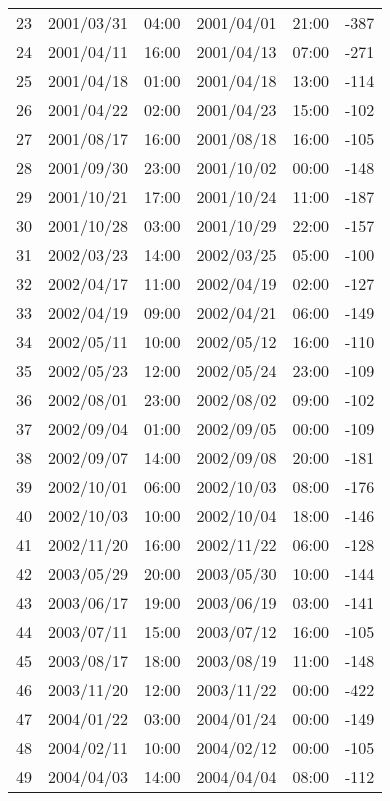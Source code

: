 \begin{table}[h]
\begin{tabular}{cccccc}
    23 & 2001/03/31 & 04:00 & 2001/04/01 & 21:00 & -387 \\
    24 & 2001/04/11 & 16:00 & 2001/04/13 & 07:00 & -271 \\
    25 & 2001/04/18 & 01:00 & 2001/04/18 & 13:00 & -114 \\
    26 & 2001/04/22 & 02:00 & 2001/04/23 & 15:00 & -102 \\
    27 & 2001/08/17 & 16:00 & 2001/08/18 & 16:00 & -105 \\
    28 & 2001/09/30 & 23:00 & 2001/10/02 & 00:00 & -148 \\
    29 & 2001/10/21 & 17:00 & 2001/10/24 & 11:00 & -187 \\
    30 & 2001/10/28 & 03:00 & 2001/10/29 & 22:00 & -157 \\
    31 & 2002/03/23 & 14:00 & 2002/03/25 & 05:00 & -100 \\
    32 & 2002/04/17 & 11:00 & 2002/04/19 & 02:00 & -127 \\
    33 & 2002/04/19 & 09:00 & 2002/04/21 & 06:00 & -149 \\
    34 & 2002/05/11 & 10:00 & 2002/05/12 & 16:00 & -110 \\
    35 & 2002/05/23 & 12:00 & 2002/05/24 & 23:00 & -109 \\
    36 & 2002/08/01 & 23:00 & 2002/08/02 & 09:00 & -102 \\
    37 & 2002/09/04 & 01:00 & 2002/09/05 & 00:00 & -109 \\
    38 & 2002/09/07 & 14:00 & 2002/09/08 & 20:00 & -181 \\
    39 & 2002/10/01 & 06:00 & 2002/10/03 & 08:00 & -176 \\
    40 & 2002/10/03 & 10:00 & 2002/10/04 & 18:00 & -146 \\
    41 & 2002/11/20 & 16:00 & 2002/11/22 & 06:00 & -128 \\
    42 & 2003/05/29 & 20:00 & 2003/05/30 & 10:00 & -144 \\
    43 & 2003/06/17 & 19:00 & 2003/06/19 & 03:00 & -141 \\
    44 & 2003/07/11 & 15:00 & 2003/07/12 & 16:00 & -105 \\
    45 & 2003/08/17 & 18:00 & 2003/08/19 & 11:00 & -148 \\
    46 & 2003/11/20 & 12:00 & 2003/11/22 & 00:00 & -422 \\
    47 & 2004/01/22 & 03:00 & 2004/01/24 & 00:00 & -149 \\
    48 & 2004/02/11 & 10:00 & 2004/02/12 & 00:00 & -105 \\
    49 & 2004/04/03 & 14:00 & 2004/04/04 & 08:00 & -112 \\

\end{tabular}
\end{table}
